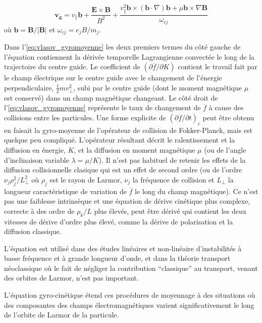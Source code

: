 \documentclass[main.tex]{subfiles}
\begin{document}
\begin{equation}
	\bm{v_g} = v_\parallel \bm{b} + \frac{\bm{E} \times \bm{B}}{B^2} + \frac{v_\parallel^2 \bm{b} \times \left( \bm{b} \cdot \nabla \right) \bm{b} + \mu \bm{b} \times \nabla \bm{B}}{\omega_{cj}}
	\label{eq:vitesse_guide_derives}
\end{equation}
où \( \bm{b} = \bm{B} / \left\vert \bm{B} \right\vert \) et \( \omega_{cj} = e_j B / m_j \).

Dans l'\autoref{eq:vlasov_gyromoyenne} les deux premiers termes du côté gauche de l'équation contiennent la dérivée temporelle Lagrangienne convectée le long de la trajectoire du centre guide.
Le coefficient de \( \left( \partial \overline{f}/\partial K  \right) \) contient le travail fait par le champ électrique sur le centre guide avec le changement de l'énergie perpendiculaire, \( \frac{1}{2} m v_\perp^2 \), subi par le centre guide (dont le moment magnétique \( \mu \) est conservé) dans un champ magnétique changeant.
Le côté droit de l'\autoref{eq:vlasov_gyromoyenne} représente le taux de changement de \( \overline{f} \) à cause des collisions entre les particules.
Une forme explicite de \( \left( \partial \overline{f} / \partial t \right)_c \) peut être obtenu en faisait la gyro-moyenne de l'opérateur de collision de Fokker-Planck, mais est quelque peu compliqué.
L'opérateur résultant décrit le ralentissement et la diffusion en énergie, \( K \), et la diffusion en moment magnétique \( \mu \) (ou de l'angle d'inclinaison variable \( \lambda = \mu / K \)).
Il n'est pas habituel de retenir les effets de la diffusion collisionnelle clasique qui est un effet de second ordre (ou de l'ordre \( \nu_j \rho_j^2 / L_\perp^2 \) où \( \rho_j \) est le rayon de Larmor, \( \nu_j \) la fréquence de collision et \( L_\perp \) la longueur caractéristique de variation de \( \overline{f} \) le long du champ magnétique).
Ce n'est pas une faiblesse intrinsèque et une équation de dérive cinétique plus complexe, correcte à des ordre de \( \rho_k / L \) plus élevés, peut être dérivé qui contient les deux vitesses de dérive d'ordre plus élevé, comme la dérive de polarisation et la diffusion classique.

L'équation est utilisé dans des études linéaires et non-linéaire d'instabilités à basse fréquence et à grande longueur d'onde, et dans la théorie transport néoclassique où le fait de négliger la contribution ``classique'' au transport, venant des orbites de Larmor, n'est pas important.

L'équation gyro-cinétique étend ces procédures de moyennage à des situations où des composantes des champs électromagnétiques varient significativement le long de l'orbite de Larmor de la particule.
\end{document}
